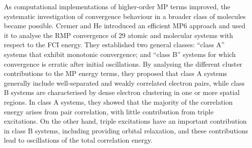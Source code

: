 \documentclass[aps,prb,reprint,noshowkeys,linenumbers,superscriptaddress]{revtex4-1}
\begin{document}
As computational implementations of higher-order MP terms improved, the systematic investigation 
of convergence behaviour in a broader class of molecules became possible.
Cremer and He introduced an efficient MP6 approach and used it to analyse the RMP convergence of
29 atomic and molecular systems with respect to the FCI energy.\cite{Cremer_1996}
They established two general classes: ``class A'' systems that exhibit monotonic convergence; 
and ``class B'' systems for which convergence is erratic after initial oscillations. 
By analysing the different cluster contributions to the MP energy terms, they proposed that
class A systems generally include well-separated and weakly correlated electron pairs, while class B systems
are characterised by dense electron clustering in one or more spatial regions.\cite{Cremer_1996}
In class A systems, they showed that the majority of the correlation energy arises from pair correlation, 
with little contribution from triple excitations.
On the other hand, triple excitations have an important contribution in class B systems, including providing
orbital relaxation, and these contributions lead to oscillations of the total correlation energy.
\end{document}
